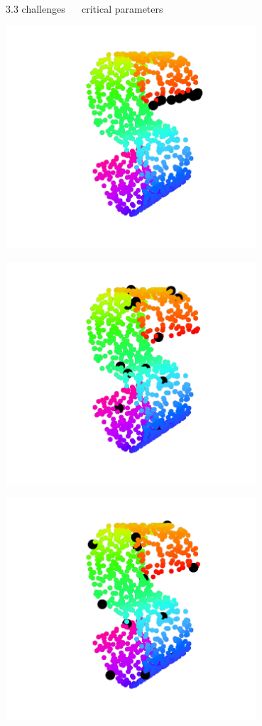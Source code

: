 \documentclass[11pt, compress, t, notes = noshow, xcolor = table, 
aspectratio = 1610]{beamer}
\begin{document}
\begin{frame}{\textcolor{gray!90}{3.3 challenges} ~~ critical parameters}
\begin{minipage}[t]{0.33\textwidth}
  \includegraphics[trim = 80 20 60 0, clip, %
      width = 0.7\textwidth]{figures/s_curve_pp_poor}
\end{minipage}%
\begin{minipage}[t]{0.33\textwidth}
  \includegraphics[trim = 80 20 60 0, clip, %
      width = 0.7\textwidth]{figures/s_curve_pp_random}
\end{minipage}%
\begin{minipage}[t]{0.33\textwidth}
    \includegraphics[trim = 80 20 60 0, clip, %
    width = 0.7\textwidth]{figures/s_curve_pp_maxmin}
\end{minipage}


\end{frame}
\end{document}
